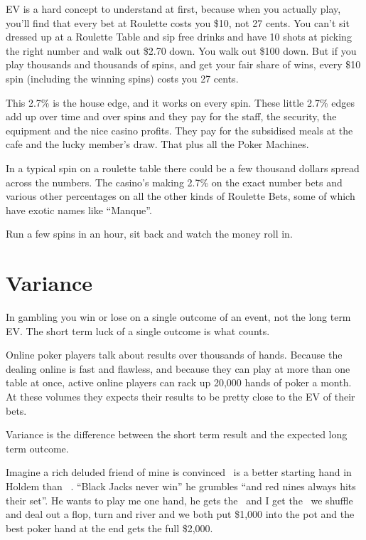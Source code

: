 EV is a hard concept to understand at first, because when you actually
play, you'll find that every bet at Roulette costs you \$10, not
27 cents. You can't sit dressed up at a Roulette Table and sip free
drinks and have 10 shots at picking the right number and walk out \$2.70
down. You walk out \$100 down. But if you play thousands and thousands
of spins, and get your fair share of wins, every \$10 spin (including 
the winning spins) costs you 27 cents. 

This 2.7\% is the house edge, and it works on every spin. These little 2.7\%
edges add up over time and over spins and they pay for the staff, the
security, the equipment and the nice casino profits. They pay for the
subsidised meals at the cafe and the lucky member's draw. That plus
all the Poker Machines.

In a typical spin on a roulette table there could be a few thousand dollars
spread across the numbers. The casino's making 2.7\% on the exact number
bets and various other percentages on all the other kinds of Roulette Bets, 
some of which have exotic names like ``Manque''.

Run a few spins in an hour, sit back and watch the money roll in.

\section{Variance}

In gambling you win or lose on a single outcome of an event,
not the long term EV. The short term luck of a single outcome
is what counts.

Online poker players talk about results over thousands of hands. Because the
dealing online is fast and flawless, and because they can play at
more than one table at once, active online players can rack up
20,000 hands of poker a month. At these volumes they expects their
results to be pretty close to the EV of their bets.

Variance is the difference between the short term result and the
expected long term outcome.

Imagine a rich deluded friend of mine is convinced \nineh\nined\ is a better
starting hand in Holdem than \Jc\Js\ . ``Black Jacks never win'' he grumbles
``and red nines always hits their set''. He wants to play me one hand, he
gets the \nineh\nined\ and I get the \Jc\Js\, we shuffle and deal out a flop,
turn and river and we both put \$1,000 into the pot and the best
poker hand at the end gets the full \$2,000.

